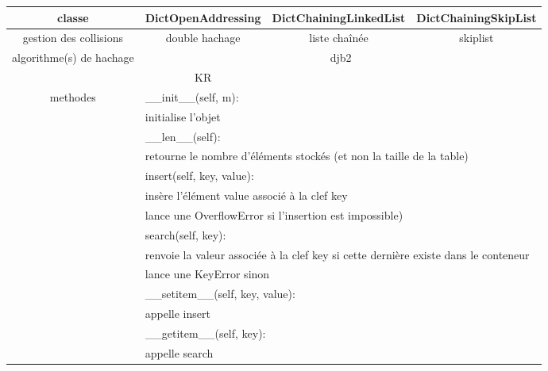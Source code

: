 \documentclass[utf8]{article}
\begin{document}
\begin{tabular}{|c|c|c|c|} 
\hline
classe & DictOpenAddressing & DictChainingLinkedList & DictChainingSkipList \\
\hline

gestion des collisions & double hachage & liste chaînée & skiplist \\
\hline

\multirow{2}{*}{algorithme(s) de hachage} & \multicolumn{3}{c|}{djb2} \\\cline{2-4}
                                        & KR & \multicolumn{2}{|c|}{} \\
\hline

\multirow{8}{*}{methodes} & \multicolumn{3}{l|}{\_\_init\_\_(self, m):} \\
                            & \multicolumn{3}{l|}{initialise l’objet} \\\cline{2-4}
                        & \multicolumn{3}{l|}{\_\_len\_\_(self):} \\
                         & \multicolumn{3}{l|}{retourne le nombre d’éléments stockés (et non la taille de la table)} \\\cline{2-4}
                         
                         & \multicolumn{3}{l|}{insert(self, key, value):}\\
                         & \multicolumn{3}{l|}{insère l’élément value associé à la clef key }\\
                         & \multicolumn{3}{l|}{lance une OverflowError
                            si l’insertion est impossible)} \\\cline{2-4}
                            
                         & \multicolumn{3}{l|}{search(self, key):}\\
                         & \multicolumn{3}{l|}{renvoie la valeur associée à la clef key si cette dernière existe dans le
                        conteneur}\\
                        & \multicolumn{3}{l|}{lance une KeyError sinon} \\\cline{2-4}
                         & \multicolumn{3}{l|}{\_\_setitem\_\_(self, key, value):}\\
                         & \multicolumn{3}{l|}{appelle insert} \\\cline{2-4}
                         
                         & \multicolumn{3}{l|}{\_\_getitem\_\_(self, key):}\\
                         & \multicolumn{3}{l|}{appelle search}\\\cline{2-4}
                            

\end{tabular}
\end{document}
